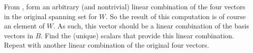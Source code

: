 From , form an arbitrary (and nontrivial) linear combination of the four vectors in the original spanning set for $W$.  So the result of this computation is of course an element of $W$.  As such, this vector should be a linear combination of the basis vectors in $B$.  Find the (unique) scalars that provide this linear combination.  Repeat with another linear combination of the original four vectors.